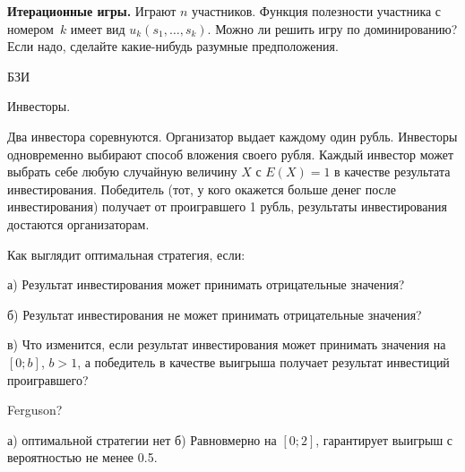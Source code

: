 \begin{problem}
 {\bf Итерационные игры.} Играют $n$ участников.
Функция полезности участника с номером~$k$ имеет вид
$u_k(s_1,\ldots,s_k)$. Можно ли решить игру по
доминированию? Если надо, сделайте какие-нибудь разумные
предположения.



\begin{source}
БЗИ
\end{source}


\begin{sol}

\end{sol}
\end{problem}



\begin{problem}
Инвесторы.

Два инвестора соревнуются. Организатор выдает каждому один рубль. Инвесторы одновременно выбирают способ вложения своего рубля. Каждый инвестор может выбрать себе любую случайную величину $X$ с $E(X)=1$ в качестве результата инвестирования. Победитель (тот, у кого окажется больше денег после инвестирования) получает от проигравшего 1 рубль, результаты инвестирования достаются организаторам.

Как выглядит оптимальная стратегия, если:

а) Результат инвестирования может принимать отрицательные значения?

б) Результат инвестирования не может принимать отрицательные значения?

в) Что изменится, если результат инвестирования может принимать значения на $[0;b]$, $b>1$, а победитель в качестве выигрыша получает результат инвестиций проигравшего?



\begin{source}
Ferguson?
\end{source}


\begin{sol}
а) оптимальной стратегии нет б) Равновмерно на $[0;2]$, гарантирует выигрыш с вероятностью не менее 0.5.
\end{sol}
\end{problem}



